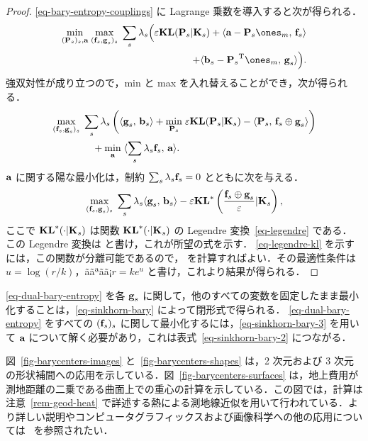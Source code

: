 \begin{proof}	\eqref{eq-bary-entropy-couplings} に Lagrange 乗数を導入すると次が得られる．
	\begin{align*}
		\umin{ (\P_s)_s, \a }
		\umax{ ( \fD_s,\gD_s )_s }
		\sum_{s} \la_s \Big(
			\epsilon \KLD( \P_s|\K_s )
			+
			\dotp{\a - \P_s\ones_m}{ \fD_s } \\
		\qquad\qquad	+
			\dotp{\b_s - \transp{\P_s}\ones_m}{ \gD_s }
		\Big).
	\end{align*}
	強双対性が成り立つので，min と max を入れ替えることができ，次が得られる．
		\begin{align*}
		&\underset{ ( \mathrm{\textbf{f}}_s,\mathrm{\textbf{g}}_s )_s }{\max}\;
			\sum_s \lambda_s \left( 
				 \langle \mathrm{\textbf{g}}_s,\,\mathrm{\textbf{b}}_s\rangle
		+
		\underset{\mathrm{\textbf{P}}_s}{\min}\; \varepsilon \mathrm{\textbf{KL}}( \mathrm{\textbf{P}}_s|\mathrm{\textbf{K}}_s ) - \langle \mathrm{\textbf{P}}_s,\,\mathrm{\textbf{f}}_s \oplus \mathrm{\textbf{g}}_s \rangle
		 \right) \\
	&\qquad\qquad	+ \underset{\mathrm{\textbf{a}}}{\min}\;
			\langle  \sum_{s} \lambda_s \mathrm{\textbf{f}}_s ,\,\mathrm{\textbf{a}}\rangle.
	\end{align*}
	$\mathrm{\textbf{a}}$ に関する陽な最小化は，制約 $\sum_{s} \lambda_s \mathrm{\textbf{f}}_s=0$ とともに次を与える．
	\begin{align*}
		\underset{ ( \mathrm{\textbf{f}}_s,\mathrm{\textbf{g}}_s )_s }{\max}\;
			\sum_s \lambda_s
				 \langle \mathrm{\textbf{g}}_s,\,\mathrm{\textbf{b}}_s\rangle
		-
		\varepsilon \mathrm{\textbf{KL}}^*\left(  \frac{\mathrm{\textbf{f}}_s \oplus \mathrm{\textbf{g}}_s}{\varepsilon}|\mathrm{\textbf{K}}_s  \right),
	\end{align*}
	ここで $\mathrm{\textbf{KL}}^*(\cdot|\mathrm{\textbf{K}}_s)$ は関数 $\mathrm{\textbf{KL}}^*(\cdot|\mathrm{\textbf{K}}_s)$ の Legendre 変換~\eqref{eq-legendre} である．
	この Legendre 変換は
	と書け，これが所望の式を示す．
	\eqref{eq-legendre-kl} を示すには，この関数が分離可能であるので，
	を計算すればよい．その最適性条件は $u=\log(r/k)$，ããªãã¡$r = k e^{u}$ と書け，これより結果が得られる．
\end{proof}

\eqref{eq-dual-bary-entropy} を各 $\mathrm{\textbf{g}}_s$ に関して，他のすべての変数を固定したまま最小化することは，\eqref{eq-sinkhorn-bary} によって閉形式で得られる．
%
\eqref{eq-dual-bary-entropy} をすべての $(\mathrm{\textbf{f}}_s)_s$ に関して最小化するには，\eqref{eq-sinkhorn-bary-3} を用いて $\mathrm{\textbf{a}}$ について解く必要があり，これは表式~\eqref{eq-sinkhorn-bary-2} につながる．



図~\ref{fig-barycenters-images} と~\ref{fig-barycenters-shapes} は，2 次元および 3 次元の形状補間への応用を示している．図~\ref{fig-barycenters-surfaces} は，地上費用が測地距離の二乗である曲面上での重心の計算を示している．この図では，計算は注意~\ref{rem-geod-heat} で詳述する熱による測地線近似を用いて行われている．より詳しい説明やコンピュータグラフィックスおよび画像科学への他の応用については~\citep{2015-solomon-siggraph} を参照されたい．

